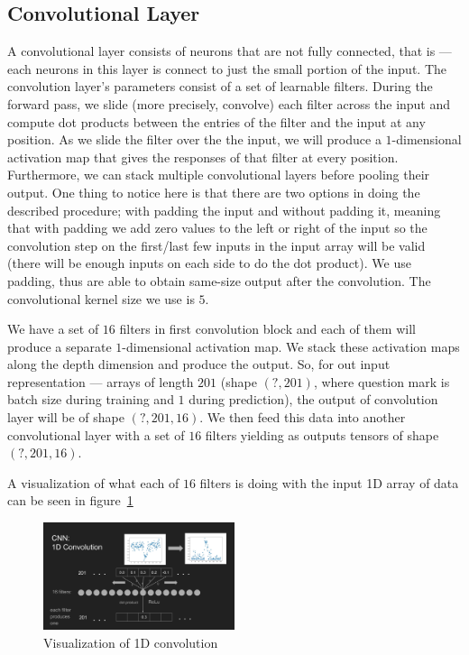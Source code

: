 \documentclass[twoside]{article}
\begin{document}
\begin{multicols}{2}
\subsection{Convolutional Layer}
A convolutional layer consists of neurons that are not fully connected, that is --- each neurons in this layer is connect to just the small portion of the input. The convolution layer's parameters consist of a set of learnable filters. During the forward pass, we slide (more precisely, convolve) each filter across the input and compute dot products between the entries of the filter and the input at any position. As we slide the filter over the the input, we will produce a $1$-dimensional activation map that gives the responses of that filter at every position. Furthermore, we can stack multiple convolutional layers before pooling their output. One thing to notice here is that there are two options in doing the described procedure; with padding the input and without padding it, meaning that with padding we add zero values to the left or right of the input so the convolution step on the first/last few inputs in the input array will be valid (there will be enough inputs on each side to do the dot product). We use padding, thus are able to obtain same-size output after the convolution. The convolutional kernel size we use is $5$.

We have a set of $16$ filters in first convolution block and each of them will produce a separate $1$-dimensional activation map. We stack these activation maps along the depth dimension and produce the output. So, for out input representation --- arrays of length $201$ (shape $(?,201)$, where question mark is batch size during training and $1$ during prediction), the output of convolution layer will be of shape $(?,201,16)$. We then feed this data into another convolutional layer with a set of $16$ filters yielding as outputs tensors of shape $(?,201,16)$.

A visualization of what each of $16$ filters is doing with the input 1D array of data can be seen in figure~\ref{fig:1d_conv} 
\begin{figure}[H]
\includegraphics[width=0.5\textwidth]{1d_conv}
\caption{Visualization of 1D convolution}
\label{fig:1d_conv}
\end{figure}


\end{multicols}
\end{document}
